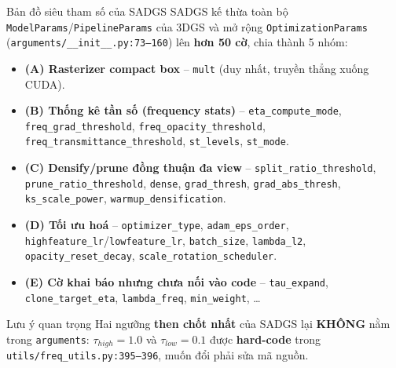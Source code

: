 
\begin{frame}{Bản đồ siêu tham số của SADGS}
\footnotesize
SADGS kế thừa toàn bộ \texttt{ModelParams}/\texttt{PipelineParams} của 3DGS và mở rộng \texttt{OptimizationParams}
(\texttt{arguments/\_\_init\_\_.py:73--160}) lên \textbf{hơn 50 cờ}, chia thành 5 nhóm:
\begin{itemize}\itemsep1pt
    \item \textbf{(A) Rasterizer compact box} -- \texttt{mult} (duy nhất, truyền thẳng xuống CUDA).
    \item \textbf{(B) Thống kê tần số (frequency stats)} -- \texttt{eta\_compute\_mode}, \texttt{freq\_grad\_threshold}, \texttt{freq\_opacity\_threshold}, \texttt{freq\_transmittance\_threshold}, \texttt{st\_levels}, \texttt{st\_mode}.
    \item \textbf{(C) Densify/prune đồng thuận đa view} -- \texttt{split\_ratio\_threshold}, \texttt{prune\_ratio\_threshold}, \texttt{dense}, \texttt{grad\_thresh}, \texttt{grad\_abs\_thresh}, \texttt{ks\_scale\_power}, \texttt{warmup\_densification}.
    \item \textbf{(D) Tối ưu hoá} -- \texttt{optimizer\_type}, \texttt{adam\_eps\_order}, \texttt{highfeature\_lr}/\texttt{lowfeature\_lr}, \texttt{batch\_size}, \texttt{lambda\_l2}, \texttt{opacity\_reset\_decay}, \texttt{scale\_rotation\_scheduler}.
    \item \textbf{(E) Cờ khai báo nhưng chưa nối vào code} -- \texttt{tau\_expand}, \texttt{clone\_target\_eta}, \texttt{lambda\_freq}, \texttt{min\_weight}, \dots
\end{itemize}
\vspace{0.15cm}
\begin{block}{\footnotesize Lưu ý quan trọng}
\footnotesize
Hai ngưỡng \textbf{then chốt nhất} của SADGS lại \textbf{KHÔNG} nằm trong \texttt{arguments}: $\tau_{high}=1.0$ và $\tau_{low}=0.1$
được \textbf{hard-code} trong \texttt{utils/freq\_utils.py:395--396}, muốn đổi phải sửa mã nguồn.
\end{block}
\end{frame}

